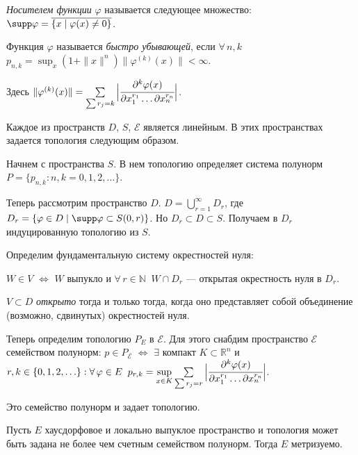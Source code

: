 \documentclass[10pt]{article}
\newcommand*{\p}[1]{#1\nobreak\discretionary{}{\hbox{$\mathsurround=0pt #1$}}{}}
\begin{document}
\begin{df}
\emph{Носителем функции} $\varphi$ называется следующее множество:
$\supp\varphi=\overline{\{x\mid \varphi(x)\neq0\}}$.
\end{df}

\begin{df}
Функция $\varphi$ называется \emph{быстро убывающей}, если
$\forall\,
n,k$\;\;$p_{n,k}=\sup_x(1+\|x\|^n)\|\varphi^{(k)}(x)\|<\infty$.
\end{df}

\begin{df}
Здесь $\|\varphi^{(k)}(x)\|=\sum\limits_{\sum
r_j=k}\Big|\cfrac{\partial^k\varphi(x)}{\partial x^{r_1}_{1 } \ldots
\partial  x^{r_n}_{n }}\Big|$.
\end{df}

Каждое из пространств $D$, $S$, $\mathcal{E}$ является линейным. В
этих пространствах задается топология следующим образом.

Начнем с пространства $S$. В нем топологию определяет система
полунорм $P=\{p_{n,k}: n,k=0,1,2,\ldots\}$.

Теперь рассмотрим пространство $D$.
$D=\bigcup\limits_{r=1}^{\infty}D_r$, где $D_{r}=\{\varphi\in D\mid
\supp \varphi\subset S(0,r)\}$. Но $D_r \subset D\subset S$.
Получаем в $D_r$ индуцированную топологию из $S$.

Определим фундаментальную систему окрестностей нуля:

$W\in V$ $\Leftrightarrow$ $W$ выпукло и $\forall\, r\in
\mathbb{N}\;\; W\cap D_r$ --- открытая окрестность нуля в $D_r$.

\begin{df}
$V\subset D$ \emph{открыто} тогда и только тогда, когда оно
представляет собой объединение (возможно, сдвинутых) окрестностей
нуля.
\end{df}

Теперь определим топологию $P_E$ в $\mathcal{E}$. Для этого снабдим
пространство $\mathcal{E}$ семейством полунорм: $p\in P_\mathcal{E}$
$\Leftrightarrow$ $\exists$ компакт $K\subset \mathbb{R}^n$ и
$r,k\p\in \{0,1,2,\ldots\}: \forall\, \varphi \in E\;\;
p_{r,k}=\sup\limits_{x\in K}\sum\limits_{\sum
r_j=r}\Big|\cfrac{\partial^k\varphi(x)}{\partial x^{r_1}_{1 } \ldots
\partial  x^{r_n}_{n }}\Big|$.

Это семейство полунорм и задает топологию.

\begin{theorem}
Пусть $E$ хаусдорфовое и локально выпуклое пространство и топология
может быть задана не более чем счетным семейством полунорм. Тогда
$E$ метризуемо.
\end{theorem}
\end{document}
